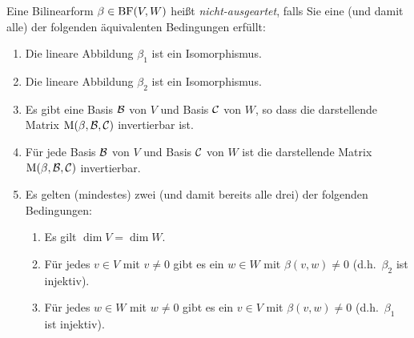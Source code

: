 \begin{definition}
  Eine Bilinearform $\beta \in \operatorname{BF}(V,W)$ heißt \emph{nicht-ausgeartet}, falls Sie eine \textup(und damit alle\textup) der folgenden äquivalenten Bedingungen erfüllt:
  \begin{enumerate}
    \item
      Die lineare Abbildung $\beta_1$ ist ein Isomorphismus.
    \item
      Die lineare Abbildung $\beta_2$ ist ein Isomorphismus.
    \item
      Es gibt eine Basis $\mathcal{B}$ von $V$ und Basis $\mathcal{C}$ von $W$, so dass die darstellende Matrix $\operatorname{M}(\beta, \mathcal{B}, \mathcal{C})$ invertierbar ist.
    \item
      Für jede Basis $\mathcal{B}$ von $V$ und Basis $\mathcal{C}$ von $W$ ist die darstellende Matrix $\operatorname{M}(\beta, \mathcal{B}, \mathcal{C})$ invertierbar.
    \item
      Es gelten \textup(mindestes\textup) zwei \textup(und damit bereits alle drei\textup) der folgenden Bedingungen:
      \begin{enumerate}
        \item
          Es gilt $\dim V = \dim W$.
        \item
          Für jedes $v \in V$ mit $v \neq 0$ gibt es ein $w \in W$ mit $\beta(v,w) \neq 0$ \textup(d.h.\ $\beta_2$ ist injektiv\textup).
        \item
          Für jedes $w \in W$ mit $w \neq 0$ gibt es ein $v \in V$ mit $\beta(v,w) \neq 0$ \textup(d.h.\ $\beta_1$ ist injektiv\textup).
      \end{enumerate}
  \end{enumerate}
\end{definition}

